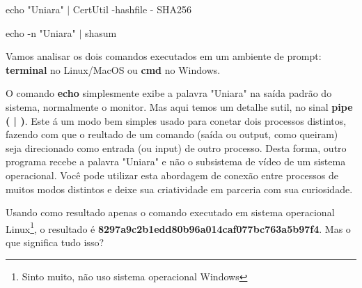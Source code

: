 \begin{tcolorbox}[title=No sistema operacional Windows]
    echo "Uniara" $|$ CertUtil -hashfile - SHA256
\end{tcolorbox}

\begin{tcolorbox}[title=No sistema operacional Linux ou MacOS]
    echo -n "Uniara" $|$ shasum
\end{tcolorbox}

Vamos analisar os dois comandos executados em um ambiente de prompt: \textbf{terminal} no Linux/MacOS ou \textbf{cmd} no Windows.

O comando \textbf{echo} simplesmente exibe a palavra "Uniara" na saída padrão do sistema, normalmente o monitor. Mas aqui temos um detalhe sutil, no sinal \textbf{pipe ( | )}. Este á um modo bem simples usado para conetar dois processos distintos, fazendo com que o reultado de um comando (saída ou output, como queiram) seja direcionado como entrada (ou input) de outro processo. Desta forma, outro programa recebe a palavra "Uniara" e não o subsistema de vídeo de um sistema operacional. Você pode utilizar esta abordagem de conexão entre processos de muitos modos distintos e deixe sua criatividade em parceria com sua curiosidade.

Usando como resultado apenas o comando executado em sistema operacional Linux\footnote{Sinto muito, não uso sistema operacional Windows}, o resultado é \textbf{8297a9c2b1edd80b96a014caf077bc763a5b97f4}. Mas o que significa tudo isso?

